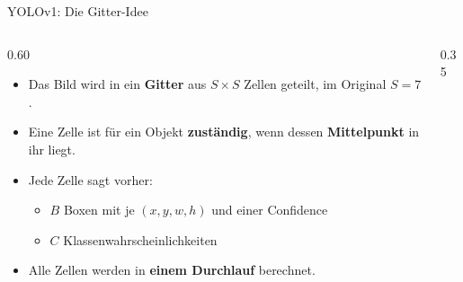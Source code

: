 \begin{frame}{YOLOv1: Die Gitter-Idee}
\begin{columns}
\begin{column}{0.60\textwidth}
\begin{itemize}
  \item Das Bild wird in ein \textbf{Gitter} aus $S \times S$ Zellen geteilt, im Original $S = 7$.
  \item Eine Zelle ist für ein Objekt \textbf{zuständig}, wenn dessen \textbf{Mittelpunkt} in ihr liegt.
  \item Jede Zelle sagt vorher:
  \begin{itemize}
    \item $B$ Boxen mit je $(x, y, w, h)$ und einer Confidence
    \item $C$ Klassenwahrscheinlichkeiten
  \end{itemize}
  \item Alle Zellen werden in \textbf{einem Durchlauf} berechnet.
\end{itemize}
\end{column}
\begin{column}{0.35\textwidth}
\centering
{}
\end{column}
\end{columns}
\end{frame}


